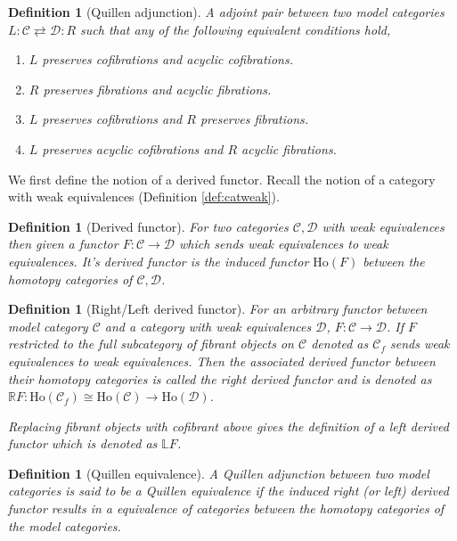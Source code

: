 \documentclass[12pt]{report}
\numberwithin{equation}{section}
\newtheorem{definition}[dummy]{Definition}
\begin{document}
	\begin{definition}[Quillen adjunction]
		A adjoint pair between two model categories \( L:\mathcal{C} \rightleftarrows \mathcal{D}: R \) such that any of the following equivalent conditions hold,
		\begin{enumerate}
			\item \( L \) preserves cofibrations and acyclic cofibrations.
			\item \( R \) preserves fibrations and acyclic fibrations.
			\item \( L \) preserves cofibrations and \( R \) preserves fibrations.
			\item \( L \) preserves acyclic cofibrations and \( R \) acyclic fibrations.
		\end{enumerate}
	\end{definition}
	
	We first define the notion of a derived functor. Recall the notion of a category with weak equivalences (Definition \ref{def:catweak}).
	
	\begin{definition}[Derived functor]
		For two categories \( \mathcal{C, D} \) with weak equivalences then given a functor \( F:\mathcal{C} \to \mathcal{D} \) which sends weak equivalences to weak equivalences. It's derived functor is the induced functor \( \mathrm{Ho}(F) \) between the homotopy categories of \( \mathcal{C, D} \).
	\end{definition}
	
	\begin{definition}[Right/Left derived functor]
		For an arbitrary functor between model category \( \mathcal{C} \) and a category with weak equivalences \( \mathcal{D} \), \( F: \mathcal{C} \to \mathcal{D} \).
		If \( F \) restricted to the full subcategory of fibrant objects on \( \mathcal{C} \) denoted as \( \mathcal{C}_f \) sends weak equivalences to weak equivalences. Then the associated derived functor between their homotopy categories is called the right derived functor and is denoted as \( \mathbb{R}F: \mathrm{Ho}(\mathcal{C}_f)\cong \mathrm{Ho}(\mathcal{C}) \to \mathrm{Ho}(\mathcal{D})  \). 
		
		Replacing fibrant objects with cofibrant above gives the definition of a left derived functor which is denoted as \( \mathbb{L}F \).
	\end{definition}
	
	\begin{definition}[Quillen equivalence]
		A Quillen adjunction between two model categories is said to be a Quillen equivalence if the induced right (or left) derived functor results in a equivalence of categories between the homotopy categories of the model categories.
	\end{definition}
	
\end{document}
